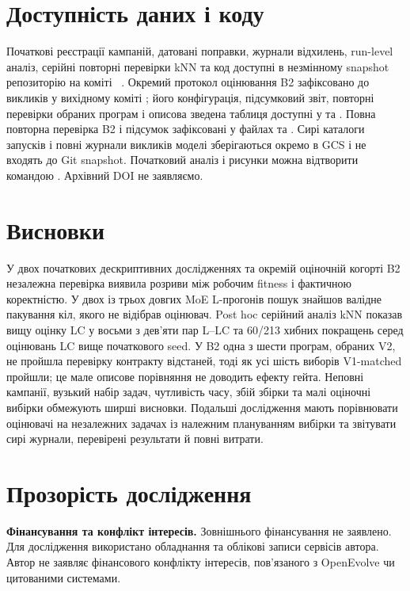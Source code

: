 \documentclass[11pt]{article}
\begin{document}
\section{Доступність даних і коду}\label{sec:availability}

Початкові реєстрації кампаній, датовані поправки, журнали відхилень, run-level аналіз, серійні повторні перевірки kNN та код доступні в незмінному snapshot репозиторію на коміті ~\citep{pylypenko2026artifacts}. Окремий протокол оцінювання B2 зафіксовано до викликів у вихідному коміті ; його конфігурація, підсумковий звіт, повторні перевірки обраних програм і описова зведена таблиця доступні у  та . Повна повторна перевірка B2 і підсумок зафіксовані у файлах  та . Сирі каталоги запусків і повні журнали викликів моделі зберігаються окремо в GCS і не входять до Git snapshot. Початковий аналіз і рисунки можна відтворити командою . Архівний DOI не заявляємо.

\section{Висновки}\label{sec:conclusion}

У двох початкових дескриптивних дослідженнях та окремій оціночній когорті B2 незалежна перевірка виявила розриви між робочим fitness і фактичною коректністю. У двох із трьох довгих MoE L-прогонів пошук знайшов валідне пакування кіл, якого не відібрав оцінювач. Post hoc серійний аналіз kNN показав вищу оцінку LC у восьми з дев'яти пар L--LC та 60/213 хибних покращень серед оцінювань LC вище початкового seed. У B2 одна з шести програм, обраних V2, не пройшла перевірку контракту відстаней, тоді як усі шість виборів V1-matched пройшли; це мале описове порівняння не доводить ефекту гейта. Неповні кампанії, вузький набір задач, чутливість часу, збій збірки та малі оціночні вибірки обмежують ширші висновки. Подальші дослідження мають порівнювати оцінювачі на незалежних задачах із належним плануванням вибірки та звітувати сирі журнали, перевірені результати й повні витрати.

\section*{Прозорість дослідження}
\textbf{Фінансування та конфлікт інтересів.} Зовнішнього фінансування не заявлено. Для дослідження використано обладнання та облікові записи сервісів автора. Автор не заявляє фінансового конфлікту інтересів, пов'язаного з OpenEvolve чи цитованими системами.
\end{document}
